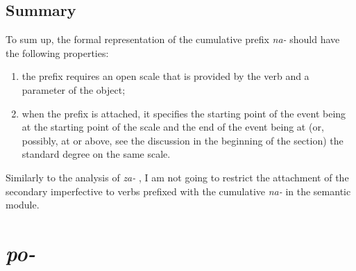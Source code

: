 \subsection{Summary} 
To sum up, the formal representation of the cumulative  prefix \textit{na-}   should have the following properties: 
\begin{enumerate}
\item the prefix requires an open scale that is provided by the verb and a parameter of the object;
\item when the prefix is attached, it specifies the starting point of the event being at the starting point of the scale and the end of the event being at (or, possibly, at or above, see the discussion in the beginning of the section) the standard degree on the same scale.
\end{enumerate}

Similarly to the analysis of \textit{za-}  , I am not going to restrict the attachment of the secondary imperfective  to verbs prefixed with the cumulative  \textit{na-}   in the semantic module.

\section{\textit{po-}  }\label{subsection:semantics:po}
